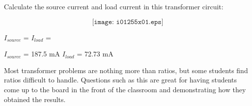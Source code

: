 

Calculate the source current and load current in this transformer circuit:

$$\texttt{[image: i01255x01.eps]}$$

$I_{source}$ = \hskip 80pt $I_{load}$ =

\vskip 10pt







$I_{source}$ = 187.5 mA \hskip 80pt $I_{load}$ = 72.73 mA







Most transformer problems are nothing more than ratios, but some students find ratios difficult to handle.  Questions such as this are great for having students come up to the board in the front of the classroom and demonstrating how they obtained the results.




